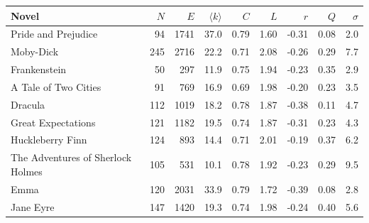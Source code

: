 \begin{tabular}{lrrrrrrrr}
\toprule
Novel & $N$ & $E$ & $\langle k\rangle$ & $C$ & $L$ & $r$ & $Q$ & $\sigma$ \\
\midrule
Pride and Prejudice & 94 & 1741 & 37.0 & 0.79 & 1.60 & -0.31 & 0.08 & 2.0 \\
Moby-Dick & 245 & 2716 & 22.2 & 0.71 & 2.08 & -0.26 & 0.29 & 7.7 \\
Frankenstein & 50 & 297 & 11.9 & 0.75 & 1.94 & -0.23 & 0.35 & 2.9 \\
A Tale of Two Cities & 91 & 769 & 16.9 & 0.69 & 1.98 & -0.20 & 0.23 & 3.5 \\
Dracula & 112 & 1019 & 18.2 & 0.78 & 1.87 & -0.38 & 0.11 & 4.7 \\
Great Expectations & 121 & 1182 & 19.5 & 0.74 & 1.87 & -0.31 & 0.23 & 4.3 \\
Huckleberry Finn & 124 & 893 & 14.4 & 0.71 & 2.01 & -0.19 & 0.37 & 6.2 \\
The Adventures of Sherlock Holmes & 105 & 531 & 10.1 & 0.78 & 1.92 & -0.23 & 0.29 & 9.5 \\
Emma & 120 & 2031 & 33.9 & 0.79 & 1.72 & -0.39 & 0.08 & 2.8 \\
Jane Eyre & 147 & 1420 & 19.3 & 0.74 & 1.98 & -0.24 & 0.40 & 5.6 \\
\bottomrule
\end{tabular}